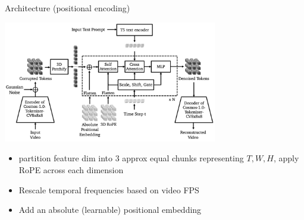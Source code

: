 \documentclass{beamer}
\begin{document}
\begin{frame}[t]{Architecture (positional encoding)}
    \vspace{-1.6em}
    \begin{center}
        \includegraphics[width=0.7\textwidth]{./img/diffusion_arch.png}
    \end{center}
    \begin{itemize}[label=-]
        \item partition feature dim into 3 approx equal chunks representing $T, W, H$, apply RoPE across each dimension
        \item Rescale temporal frequencies based on video FPS
        \item Add an absolute (learnable) positional embedding %
   \end{itemize}
\end{frame}
\end{document}
